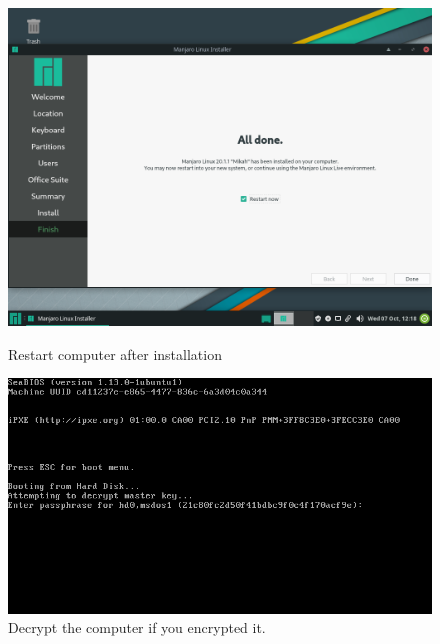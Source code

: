 \documentclass{article}
\begin{document}
\begin{figure}[ht!]
        \centering
    \begin{minipage}{0.5\textwidth}
        \includegraphics[width=.95\linewidth]{images/Restart_the_computer_to_first_login_to_the_installed_linux.png}
        \caption{Restart computer after installation}
        \label{fig:restartComputer}
    \end{minipage}\hfill
        \centering
    \begin{minipage}{0.5\textwidth}
        \includegraphics[width=.95\linewidth]{images/If_you_encrypted_the_file_system_you_will_be_asked_to_enter_the_encryptrion_key_every_time_you_turn_on_the_computer.png}
        \caption{Decrypt the computer if you encrypted it.}
        \label{fig:decryptComputer}
    \end{minipage}\hfill
        \centering
    \begin{minipage}{0.5\textwidth}

\end{minipage}
\end{figure}
\end{document}
